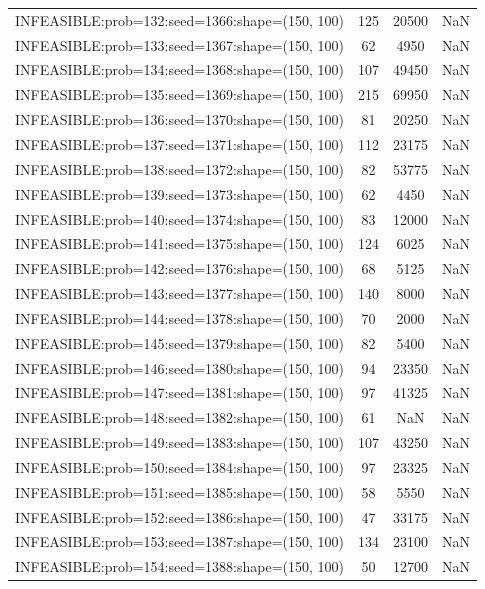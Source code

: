\begin{longtable}{lccc}
INFEASIBLE:prob=132:seed=1366:shape=(150, 100) &   125 & 20500 &    NaN \\
INFEASIBLE:prob=133:seed=1367:shape=(150, 100) &    62 &  4950 &    NaN \\
INFEASIBLE:prob=134:seed=1368:shape=(150, 100) &   107 & 49450 &    NaN \\
INFEASIBLE:prob=135:seed=1369:shape=(150, 100) &   215 & 69950 &    NaN \\
INFEASIBLE:prob=136:seed=1370:shape=(150, 100) &    81 & 20250 &    NaN \\
INFEASIBLE:prob=137:seed=1371:shape=(150, 100) &   112 & 23175 &    NaN \\
INFEASIBLE:prob=138:seed=1372:shape=(150, 100) &    82 & 53775 &    NaN \\
INFEASIBLE:prob=139:seed=1373:shape=(150, 100) &    62 &  4450 &    NaN \\
INFEASIBLE:prob=140:seed=1374:shape=(150, 100) &    83 & 12000 &    NaN \\
INFEASIBLE:prob=141:seed=1375:shape=(150, 100) &   124 &  6025 &    NaN \\
INFEASIBLE:prob=142:seed=1376:shape=(150, 100) &    68 &  5125 &    NaN \\
INFEASIBLE:prob=143:seed=1377:shape=(150, 100) &   140 &  8000 &    NaN \\
INFEASIBLE:prob=144:seed=1378:shape=(150, 100) &    70 &  2000 &    NaN \\
INFEASIBLE:prob=145:seed=1379:shape=(150, 100) &    82 &  5400 &    NaN \\
INFEASIBLE:prob=146:seed=1380:shape=(150, 100) &    94 & 23350 &    NaN \\
INFEASIBLE:prob=147:seed=1381:shape=(150, 100) &    97 & 41325 &    NaN \\
INFEASIBLE:prob=148:seed=1382:shape=(150, 100) &    61 &   NaN &    NaN \\
INFEASIBLE:prob=149:seed=1383:shape=(150, 100) &   107 & 43250 &    NaN \\
INFEASIBLE:prob=150:seed=1384:shape=(150, 100) &    97 & 23325 &    NaN \\
INFEASIBLE:prob=151:seed=1385:shape=(150, 100) &    58 &  5550 &    NaN \\
INFEASIBLE:prob=152:seed=1386:shape=(150, 100) &    47 & 33175 &    NaN \\
INFEASIBLE:prob=153:seed=1387:shape=(150, 100) &   134 & 23100 &    NaN \\
INFEASIBLE:prob=154:seed=1388:shape=(150, 100) &    50 & 12700 &    NaN \\

\end{longtable}
